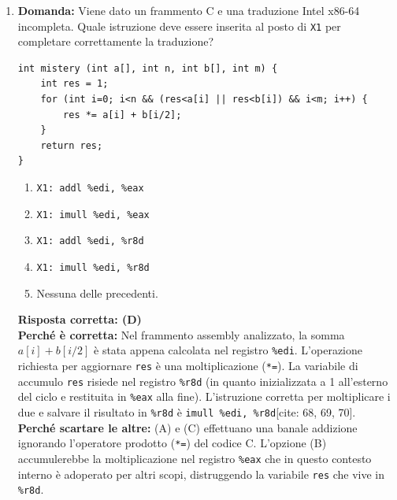 \documentclass[12pt, a4paper]{article}
\begin{document}
\begin{enumerate}
    \item \textbf{Domanda:} Viene dato un frammento C e una traduzione Intel x86-64 incompleta. Quale istruzione deve essere inserita al posto di \texttt{X1} per completare correttamente la traduzione?
\begin{verbatim}
int mistery (int a[], int n, int b[], int m) {
    int res = 1;
    for (int i=0; i<n && (res<a[i] || res<b[i]) && i<m; i++) {
        res *= a[i] + b[i/2];
    }
    return res;
}
\end{verbatim}
    \begin{enumerate}[label=(\Alph*)]
        \item \texttt{X1: addl \%edi, \%eax}
        \item \texttt{X1: imull \%edi, \%eax}
        \item \texttt{X1: addl \%edi, \%r8d}
        \item \texttt{X1: imull \%edi, \%r8d}
        \item Nessuna delle precedenti.
    \end{enumerate}
    \textbf{Risposta corretta: (D)} \\
    \textbf{Perché è corretta:} Nel frammento assembly analizzato, la somma $a[i] + b[i/2]$ è stata appena calcolata nel registro \texttt{\%edi}. L'operazione richiesta per aggiornare \texttt{res} è una moltiplicazione (\texttt{*=}). La variabile di accumulo \texttt{res} risiede nel registro \texttt{\%r8d} (in quanto inizializzata a 1 all'esterno del ciclo e restituita in \texttt{\%eax} alla fine). L'istruzione corretta per moltiplicare i due e salvare il risultato in \texttt{\%r8d} è \texttt{imull \%edi, \%r8d}[cite: 68, 69, 70]. \\
    \textbf{Perché scartare le altre:} (A) e (C) effettuano una banale addizione ignorando l'operatore prodotto (\texttt{*=}) del codice C. L'opzione (B) accumulerebbe la moltiplicazione nel registro \texttt{\%eax} che in questo contesto interno è adoperato per altri scopi, distruggendo la variabile \texttt{res} che vive in \texttt{\%r8d}.

\newpage


\end{enumerate}
\end{document}
